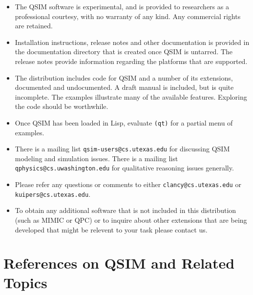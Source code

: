  \begin{itemize}

  \item The QSIM software is experimental, and is provided to
researchers as a professional courtesy, with no warranty of any kind.
Any commercial rights are retained.

  \item Installation instructions, release notes and other
documentation is provided in the documentation directory that is
created once QSIM is untarred.  The release notes provide information
regarding the platforms that are supported.

  \item The distribution includes code for QSIM and a number of its
extensions, documented and undocumented.  A draft manual is included,
but is quite incomplete.  The examples illustrate many of the
available features.  Exploring the code should be worthwhile.

  \item Once QSIM has been loaded in Lisp, evaluate {\tt (qt)} for a
partial menu of examples.

  \item There is a mailing list \mbox{\tt qsim-users@cs.utexas.edu}
for discussing QSIM modeling and simulation issues.  There is a
mailing list \mbox{\tt qphysics@cs.uwashington.edu} for qualitative
reasoning issues generally.

  \item Please refer any questions or comments to either
\mbox{\tt clancy@cs.utexas.edu} or \mbox{\tt kuipers@cs.utexas.edu}.

  \item	To obtain any additional software that is not included in this
distribution (such as MIMIC or QPC) or to inquire about other
extensions that are being developed that might be relevent to your
task please contact us.

 \end{itemize}




\section*{References on QSIM and Related Topics}

